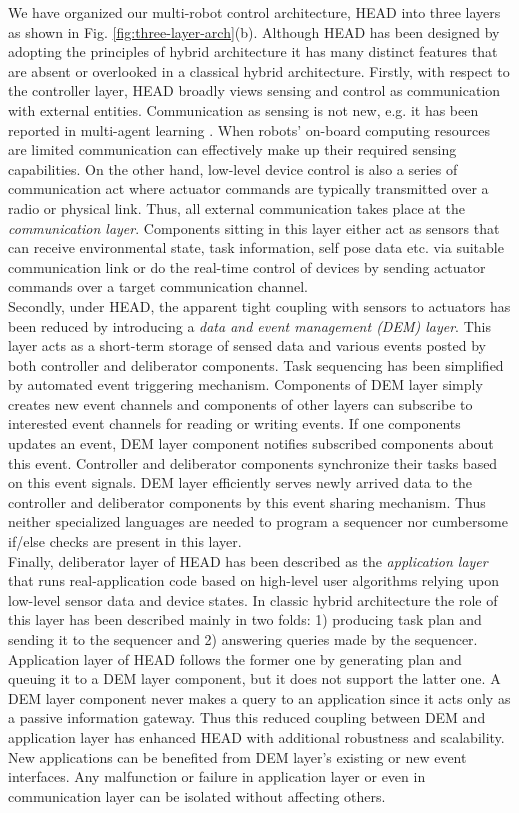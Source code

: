 \documentclass[draft]{ifacconf}
\begin{document}
We have organized our  multi-robot control architecture, HEAD into three layers as shown in Fig. \ref{fig:three-layer-arch}(b). Although HEAD has been designed by adopting the principles of hybrid architecture it has many distinct features that are absent or overlooked in a classical hybrid architecture. Firstly, with respect to the controller layer, HEAD broadly views sensing and control as communication with external entities. Communication as sensing is not new, e.g. it has been reported in multi-agent learning \citep{Mataric1998}. When robots' on-board computing resources are limited communication can effectively make up their required sensing capabilities. On the other hand, low-level device control is also a series of communication act where actuator commands are typically transmitted over a radio or physical link. Thus, all external communication takes place at the {\em communication layer}. Components sitting in this layer either act as sensors that can receive environmental state, task information, self pose data etc. via suitable communication link or do the real-time control of devices by sending actuator commands over a target communication channel. \\
Secondly, under HEAD, the apparent tight coupling with sensors to actuators has been reduced by introducing a {\em data and event management (DEM) layer}. This layer acts as a short-term storage of sensed data and various events posted by both controller and deliberator components. Task sequencing has been simplified by automated event triggering mechanism. Components of DEM layer simply creates new event channels and  components of other layers can subscribe to interested event channels for reading or writing events. If one components updates an event, DEM layer component notifies subscribed components about this event. Controller and deliberator components synchronize their tasks based on this event signals. DEM layer efficiently serves newly arrived data to the controller and deliberator components by this event sharing mechanism. Thus neither specialized languages are needed to program a sequencer nor cumbersome if/else checks are present in this layer.\\
Finally, deliberator layer of HEAD has been described as the {\em application layer} that runs real-application code based on high-level user algorithms relying upon low-level sensor data and device states. In classic hybrid architecture the role of this layer has been described mainly in two folds: 1) producing task plan and sending it to the sequencer and 2) answering queries made by the sequencer. Application layer of HEAD follows the former one by generating plan and queuing it to a DEM layer component, but it does not support the latter one. A DEM layer component never makes a query to an application since it acts only as a passive information gateway. Thus this reduced coupling between DEM and application layer has enhanced HEAD with additional robustness and scalability. New applications can be benefited from DEM layer's existing or new event interfaces. Any malfunction or failure in application layer or even in communication layer can be isolated without affecting others. 
\end{document}
